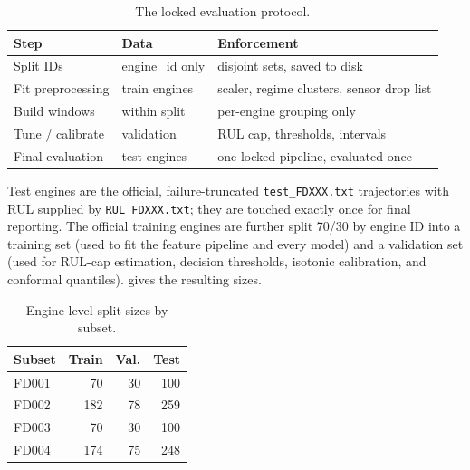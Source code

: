 \documentclass[9pt,a4paper,twocolumn,twoside]{rho-class/rho}
\begin{document}
    \begin{table}[H]
        \caption{The locked evaluation protocol.}
        \label{tab:protocol}
        \begin{tabular}{
            >{\raggedright\arraybackslash}p{}
            >{\raggedright\arraybackslash}p{}
            >{\raggedright\arraybackslash}p{}
        }
        \toprule
        \textbf{Step} & \textbf{Data} & \textbf{Enforcement} \\
        \midrule
        Split IDs & engine\_id only & disjoint sets, saved to disk \\
        Fit preprocessing & train engines & scaler, regime clusters, sensor drop list \\
        Build windows & within split & per-engine grouping only \\
        Tune / calibrate & validation & RUL cap, thresholds, intervals \\
        Final evaluation & test engines & one locked pipeline, evaluated once \\
        \bottomrule
        \end{tabular}
    \end{table}

    Test engines are the official, failure-truncated \texttt{test\_FDXXX.txt} trajectories with RUL supplied by \texttt{RUL\_FDXXX.txt}; they are touched exactly once for final reporting. The official training engines are further split 70/30 by engine ID into a training set (used to fit the feature pipeline and every model) and a validation set (used for RUL-cap estimation, decision thresholds, isotonic calibration, and conformal quantiles).  gives the resulting sizes.

    \begin{table}[H]
        \caption{Engine-level split sizes by subset.}
        \label{tab:splitsizes}
        \begin{tabular}{lrrr}
        \toprule
        \textbf{Subset} & \textbf{Train} & \textbf{Val.} & \textbf{Test} \\
        \midrule
        FD001 & 70 & 30 & 100 \\
        FD002 & 182 & 78 & 259 \\
        FD003 & 70 & 30 & 100 \\
        FD004 & 174 & 75 & 248 \\
        \bottomrule
        \end{tabular}
    \end{table}
\end{document}
